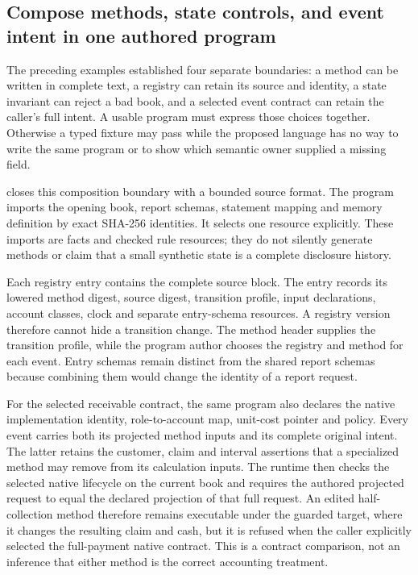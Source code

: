 \subsection{Compose methods, state controls, and event intent in one authored program}
\label{sec:common-program-authoring}

The preceding examples established four separate boundaries: a method can be
written in complete text, a registry can retain its source and identity, a
state invariant can reject a bad book, and a selected event contract can retain
the caller's full intent. A usable program must express those choices together.
Otherwise a typed fixture may pass while the proposed language has no way to
write the same program or to show which semantic owner supplied a missing field.

 closes this composition boundary with a bounded
source format. The program imports the opening book, report schemas, statement
mapping and memory definition by exact SHA-256 identities. It selects one
 resource explicitly. These imports are facts and
checked rule resources; they do not silently generate methods or claim that a
small synthetic state is a complete disclosure history.

Each registry entry contains the complete
 source block. The entry records its lowered
method digest, source digest, transition profile, input declarations, account
classes, clock and separate entry-schema resources. A registry version therefore
cannot hide a transition change. The method header supplies the transition
profile, while the program author chooses the registry and method for each
event. Entry schemas remain distinct from the shared report schemas because
combining them would change the identity of a report request.

For the selected receivable contract, the same program also declares the native
implementation identity, role-to-account map, unit-cost pointer and policy.
Every event carries both its projected method inputs and its complete original
intent. The latter retains the customer, claim and interval assertions that a
specialized method may remove from its calculation inputs. The runtime then
checks the selected native lifecycle on the current book and requires the
authored projected request to equal the declared projection of that full
request. An edited half-collection method therefore remains executable under
the guarded target, where it changes the resulting claim and cash, but it is
refused when the caller explicitly selected the full-payment native contract.
This is a contract comparison, not an inference that either method is the
correct accounting treatment.

